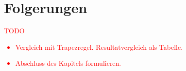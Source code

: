 %
%
%
\section{Folgerungen
\label{quadratur:section:folgerungen}}

\textcolor{red}{
    TODO
    \begin{itemize}
        \item Vergleich mit Trapezregel. Resultatvergleich als Tabelle.
        \item Abschluss des Kapitels formulieren.
    \end{itemize}
}





